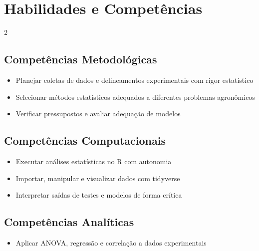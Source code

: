 \documentclass[11pt,a4paper]{article}
\begin{document}
\section*{Habilidades e Competências}

\begin{multicols}{2}

\subsection*{Competências Metodológicas}

\begin{itemize}

\item Planejar coletas de dados e delineamentos experimentais com rigor estatístico

\item Selecionar métodos estatísticos adequados a diferentes problemas agronômicos

\item Verificar pressupostos e avaliar adequação de modelos

\end{itemize}

\subsection*{Competências Computacionais}

\begin{itemize}

\item Executar análises estatísticas no R com autonomia

\item Importar, manipular e visualizar dados com tidyverse

\item Interpretar saídas de testes e modelos de forma crítica

\end{itemize}

\columnbreak

\subsection*{Competências Analíticas}

\begin{itemize}

\item Aplicar ANOVA, regressão e correlação a dados experimentais


\end{itemize}
\end{multicols}
\end{document}
